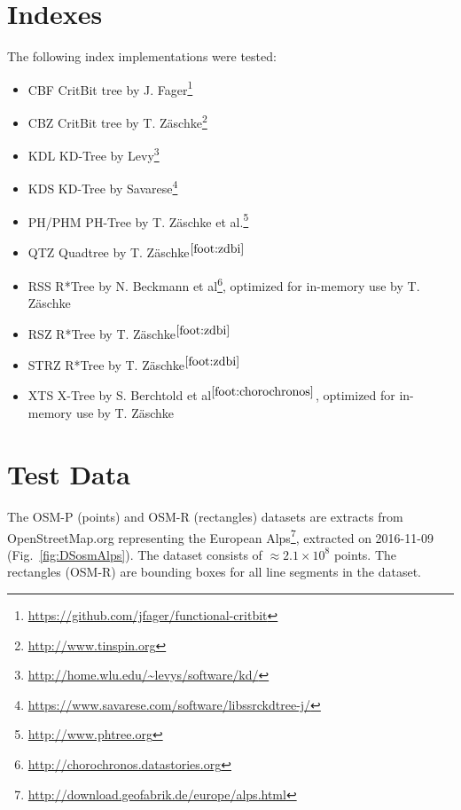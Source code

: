 \documentclass{vldb}
\begin{document}
\section{Indexes}

The following index implementations were tested:

\begin{itemize}
	\item CBF CritBit tree by J. Fager\footnote{\url{https://github.com/jfager/functional-critbit}}
	\item CBZ CritBit tree by T. Z\"{a}schke\footnote{\url{http://www.tinspin.org}\label{foot:zdbi}}
	\item KDL KD-Tree by Levy\footnote{\url{http://home.wlu.edu/~levys/software/kd/}}
	\item KDS KD-Tree by Savarese\footnote{\url{https://www.savarese.com/software/libssrckdtree-j/}}
	\item PH/PHM PH-Tree by T. Z\"{a}schke et al.\footnote{\url{http://www.phtree.org}}
	\item QTZ Quadtree by T. Z\"{a}schke$^{\ref{foot:zdbi}}$
	\item RSS R*Tree by N. Beckmann et al\footnote{\url{http://chorochronos.datastories.org}\label{foot:chorochronos}}, optimized for in-memory use by T. Z\"{a}schke
	\item RSZ R*Tree by T. Z\"{a}schke$^{\ref{foot:zdbi}}$
	\item STRZ R*Tree by T. Z\"{a}schke$^{\ref{foot:zdbi}}$
	\item XTS X-Tree by S. Berchtold et al$^{\ref{foot:chorochronos}}$, optimized for in-memory use by T. Z\"{a}schke
\end{itemize}


\section{Test Data}
\label{sec:data}


The OSM-P (points) and OSM-R (rectangles) datasets are extracts from OpenStreetMap.org representing the European Alps\footnote{\url{http://download.geofabrik.de/europe/alps.html}}, extracted on 2016-11-09 %
(Fig.~\ref{fig:DSosmAlps}). The dataset consists of $\approx 2.1 \times 10^8$ points.
The rectangles (OSM-R) are bounding boxes for all line segments in the dataset.
\end{document}
